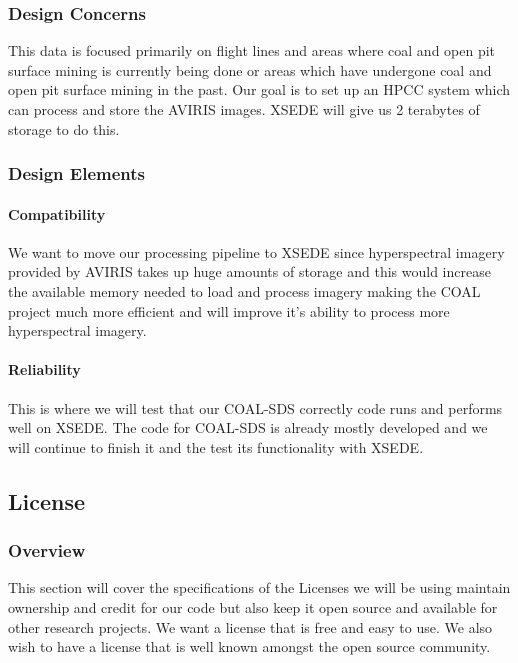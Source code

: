 \documentclass[10pt,draftclsnofoot,onecolumn,journal,compsoc]{IEEEtran}
\begin{document}
\subsubsection{Design Concerns}

\noindent This data is focused primarily on flight lines and areas where coal and open pit surface mining is currently being done or areas which have undergone coal and open pit surface mining in the past. Our goal is to set up an HPCC system which can process and store the AVIRIS images. XSEDE will give us 2 terabytes of storage to do this.

\subsubsection{Design Elements}
\paragraph{Compatibility}

\noindent We want to move our processing pipeline to XSEDE since hyperspectral imagery provided by AVIRIS takes up huge amounts of storage and this would increase the available memory needed to load and process imagery making the COAL project much more efficient and will improve it's ability to process more hyperspectral imagery.

\paragraph{Reliability}

\noindent This is where we will test that our COAL-SDS correctly code runs and performs well on XSEDE. The code for COAL-SDS is already mostly developed and we will continue to finish it and the test its functionality with XSEDE.

\subsection{License}
\subsubsection{Overview}
\noindent This section will cover the specifications of the Licenses we will be using maintain ownership and credit for our code but also keep it open source and available for other research projects. We want a license that is free and easy to use. We also wish to have a license that is well known amongst the open source community.
\end{document}
